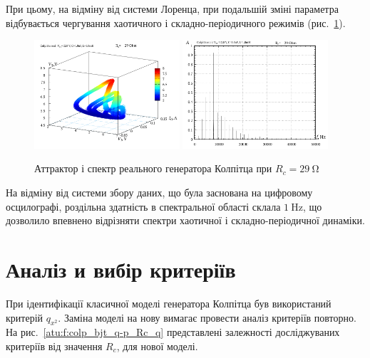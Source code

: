 При цьому, на відміну від системи Лоренца, при подальшій
зміні параметра відбувається чергування хаотичного і
складно-періодичного режимів (рис.~\ref{atu:f:colp_r_attr_f_29}).

\begin{figure}[htb!]
  \centerline{
    \includegraphics[width=0.48\textwidth]{p/r/v1iv2_029000.png}
    \hfill
    \includegraphics[width=0.48\textwidth]{p/r/f_029000.png}
  }
\caption{Аттрактор і спектр реального генератора Колпітца при $ R_c = \SI{29}{\ohm} $}
\label{atu:f:colp_r_attr_f_29}
\end{figure}

На відміну від системи збору даних, що була заснована на цифровому
осцилографі, роздільна здатність в спектральної області склала
$ \SI{1}{\hertz} $, що дозволило впевнено відрізняти спектри хаотичної
і складно-періодичної динаміки.


\section{Аналіз и вибір критеріїв}  %

При ідентифікації класичної моделі генератора Колпітца був
використаний критерій
$ q_{x^2} $. Заміна моделі на нову вимагає провести аналіз критеріїв
повторно. На рис.~\ref{atu:f:colp_bjt_q-p_Rc_q} представлені залежності
досліджуваних критеріїв від значення
$ R_c $, для нової моделі.

